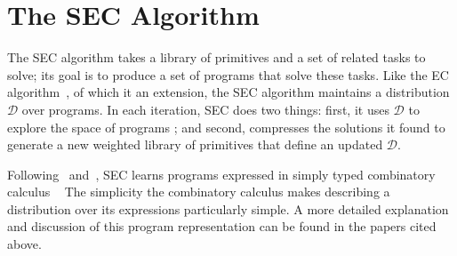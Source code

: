 \documentclass{article} %
\begin{document}



\section{The SEC Algorithm}

The SEC algorithm takes a library of primitives and a set of related tasks to solve; its goal is to produce a set of programs that solve these tasks. Like the EC algorithm~\cite{DBLP:conf/ijcai/DechterMAT13}, of which it an extension, the SEC algorithm maintains a distribution $\mathcal{D}$ over programs.
In each iteration, SEC does two things: first, it uses $\mathcal{D}$ to explore the space of programs
; and second, compresses the solutions it found to generate a new weighted library of primitives that define an updated $\mathcal{D}$.

Following~\citet{DBLP:conf/ijcai/DechterMAT13} and~\citet{DBLP:conf/icml/LiangJK10}, SEC learns programs expressed in
simply typed combinatory calculus 
~\citep{DBLP:books/daglib/0005958} %
 The simplicity the combinatory calculus makes describing a distribution over its expressions particularly simple. A more detailed explanation and discussion of this program representation can be found in the papers cited above. 
\end{document}
